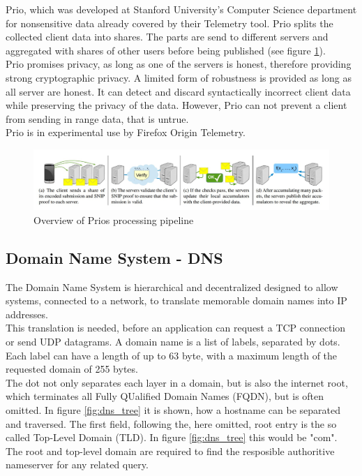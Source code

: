         Prio\cite{corrigan-gibbs_prio_2017}, which was developed at Stanford University's Computer Science department for nonsensitive data already covered by their Telemetry tool. 
        Prio splits the collected client data into shares. 
        The parts are send to different servers and aggregated with shares of other users before being published (see figure \ref{fig:prio_overview})\cite{corrigan-gibbs_prio_2017}.\\
        Prio promises privacy, as long as one of the servers is honest, therefore providing strong cryptographic privacy. A limited form of robustness is provided as long as all server are honest. It can detect and discard syntactically incorrect client data while preserving the privacy of the data. However, Prio can not prevent a client from sending in range data, that is untrue\cite{corrigan-gibbs_prio_2017}.\\
        Prio is in experimental use by Firefox Origin Telemetry\cite{englehardt_next_2019}.
        
        \begin{figure}[ht]
            \centering
            \includegraphics[width=\textwidth]{latex/figures/prio_overview.jpg}
            \caption[Overview of Prios processing pipeline]{Overview of Prios processing pipeline\cite{corrigan-gibbs_prio_2017}}
            \label{fig:prio_overview}
        \end{figure}
        
    \newpage
    
    \subsection{Domain Name System - DNS}
        \label{subsec:related:dns}
        The Domain Name System is hierarchical and decentralized designed to allow systems, connected to a network, to translate memorable domain names into IP addresses\cite{stevens_tcpip_1993}.\\
        This translation is needed, before an application can request a TCP connection or send UDP datagrams. A domain name is a list of labels, separated by dots. 
        Each label can have a length of up to 63 byte, with a maximum length of the requested domain of 255 bytes\cite{stevens_tcpip_1993}.\\
        The dot not only separates each layer in a domain, but is also the internet root, which terminates all Fully QUalified Domain Names (FQDN), but is often omitted\cite{jeftovic_managing_2018}.
        In figure \ref{fig:dns_tree} it is shown, how a hostname can be separated and traversed.
        The first field, following the, here omitted, root entry is the so called Top-Level Domain (TLD). In figure \ref{fig:dns_tree} this would be "com". The root and top-level domain are required to find the resposible authoritive nameserver for any related query\cite{jeftovic_managing_2018}.
        
